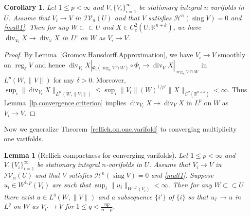 \documentclass[11pt]{amsart}
\newtheorem{corollary}[theorem]{Corollary}
\newtheorem{lemma}[theorem]{Lemma}
\theoremstyle{definition}
\newcommand{\HH}{\mathcal{H}}
\newcommand{\R}{\mathbb{R}}
\newcommand{\IV}{\mathcal{IV}}
\newcommand{\ssubset}{\subset\subset}
\DeclareMathOperator{\sing}{sing}
\DeclareMathOperator{\reg}{reg}
\DeclareMathOperator{\Div}{div}
\begin{document}
\begin{corollary}\label{div.X.converge}
		Let $1 \le p < \infty$ and $V, \{V_i\}_{i=1}^\infty$ be stationary integral $n$-varifolds in $U$. Assume that $V_i \to V$ in $\IV_n(U)$ and that $V$ satisfies $\HH^{n}(\sing V)=0$ and \eqref{mult1}. Then for any $W\ssubset U$ and $X\in C_c^2(U;\R^{n+k})$, we have $\Div_{V_i} X\to \Div_{V}X$ in $L^p$ on $W$ as $V_i\to V$.
\end{corollary}	
\begin{proof}
	By Lemma~\ref{Gromov.Hausdorff.Approximation}, we have $V_i\to V$ smoothly on $\reg_\delta V$ and hence $\Div_{V_i}X|_{\Phi_i(\reg_\delta V\cap W)}\circ \Phi_i\to \Div_{V}X|_{\reg_\delta V\cap W}$ in $L^p(W,\|V\|)$ for any $\delta>0$. Moreover, $\sup_i\|\Div_{V_i}X\|_{L^{p'}(W,\|V_i\|)}\le \sup_i\|V_i\|(W)^{1/p'}\|X\|_{C^2(\R^{n+k})}<\infty$. Thus  Lemma~\ref{lp.convergence.criterion} implies $\Div_{V_i}X\to \Div _VX$ in $L^p$ on $W$ as $V_i\to V$.
\end{proof}
Now we generalize Theorem~\ref{rellich.on.one.varifold} to converging multiplicity one varifolds.
\begin{lemma}[Rellich compactness for converging varifolds]\label{rellich.varying.varifolds}
	Let $1\le p<\infty$ and $V,\{V_i\}_{i=1}^\infty$ be stationary integral $n$-varifolds in $U$. Assume that $V_i \to V$ in $\IV_n(U)$ and that $V$ satisfies $\HH^{n}(\sing V)=0$ and \eqref{mult1}. Suppose $u_i\in W^{1,p}(V_i)$ are such that $\sup_i\|u_i\|_{W^{1,p}(V_i)}<\infty$. Then for any $W\ssubset U$  there exist $u\in L^{q}(W,\|V\|)$ and a subsequence $\{i'\}$ of $\{i\}$ so that $u_{i'}\to u$ in $L^q$ on $W$ as $V_{i'}\to V$ for $1\le q<\frac{np}{n-p}$.
\end{lemma}
\end{document}

